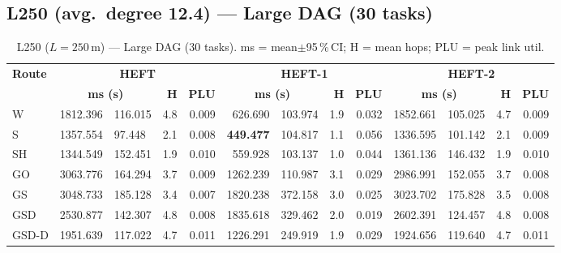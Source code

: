 \documentclass[11pt]{article}
\newcommand{\win}[1]{\textcolor{green!50!black}{\textbf{#1}}}
\newcommand{\bad}[1]{\textcolor{red!70!black}{#1}}
\begin{document}
\subsection{L250 (avg.\ degree 12.4) --- Large DAG (30 tasks)}
\begin{table}[H]\centering\small
\begin{tabular}{l r@{$\pm$}l r r r@{$\pm$}l r r r@{$\pm$}l r r}
\toprule
\textbf{Route} & \multicolumn{4}{c}{\textbf{HEFT}} & \multicolumn{4}{c}{\textbf{HEFT-1}} & \multicolumn{4}{c}{\textbf{HEFT-2}} \\
\cmidrule(lr){2-5}\cmidrule(lr){6-9}\cmidrule(lr){10-13}
& \multicolumn{2}{c}{\textbf{ms (s)}} & \textbf{H} & \textbf{PLU}& \multicolumn{2}{c}{\textbf{ms (s)}} & \textbf{H} & \textbf{PLU}& \multicolumn{2}{c}{\textbf{ms (s)}} & \textbf{H} & \textbf{PLU} \\
\midrule
  W & 1812.396 & 116.015 & 4.8 & 0.009 & 626.690 & 103.974 & 1.9 & 0.032 & 1852.661 & 105.025 & 4.7 & 0.009 \\
  S & 1357.554 & 97.448 & 2.1 & 0.008 & \win{449.477} & 104.817 & 1.1 & 0.056 & 1336.595 & 101.142 & 2.1 & 0.009 \\
  SH & 1344.549 & 152.451 & 1.9 & 0.010 & 559.928 & 103.137 & 1.0 & 0.044 & 1361.136 & 146.432 & 1.9 & 0.010 \\
  GO & \bad{3063.776} & 164.294 & 3.7 & 0.009 & 1262.239 & 110.987 & 3.1 & 0.029 & 2986.991 & 152.055 & 3.7 & 0.008 \\
  GS & 3048.733 & 185.128 & 3.4 & 0.007 & 1820.238 & 372.158 & 3.0 & 0.025 & \bad{3023.702} & 175.828 & 3.5 & 0.008 \\
  GSD & 2530.877 & 142.307 & 4.8 & 0.008 & \bad{1835.618} & 329.462 & 2.0 & 0.019 & 2602.391 & 124.457 & 4.8 & 0.008 \\
  GSD-D & 1951.639 & 117.022 & 4.7 & 0.011 & 1226.291 & 249.919 & 1.9 & 0.029 & 1924.656 & 119.640 & 4.7 & 0.011 \\
\bottomrule\end{tabular}
\caption{L250 ($L=250$\,m) --- Large DAG (30 tasks). ms = mean$\pm$95\,\%\,CI; H = mean hops; PLU = peak link util.}
\end{table}
\end{document}
